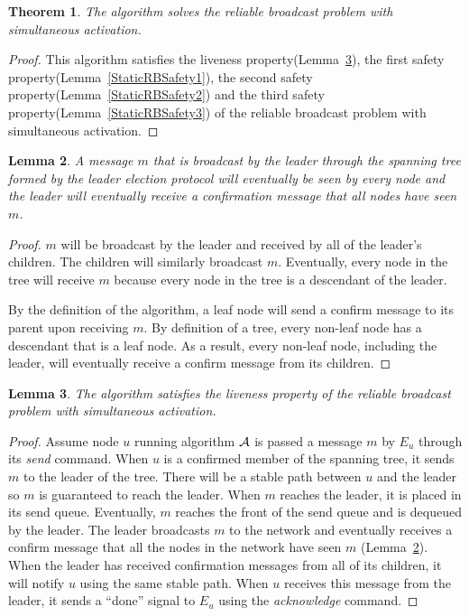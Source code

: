 \documentclass[english]{article}
\newtheorem{theorem}{Theorem}[section]
\newtheorem{lemma}[theorem]{Lemma}
\begin{document}
\begin{theorem}
\label{StaticReliableBroadcast}
The algorithm solves the reliable broadcast problem with simultaneous activation.
\end{theorem}
\begin{proof}
This algorithm satisfies the liveness property(Lemma~\ref{StaticRBLiveness}), 
the first safety property(Lemma~\ref{StaticRBSafety1}),
the second safety property(Lemma~\ref{StaticRBSafety2}) and 
the third safety property(Lemma~\ref{StaticRBSafety3}) of the reliable broadcast problem with simultaneous activation.
\end{proof}


\begin{lemma}
\label{StaticSpanningTree}
A message $m$ that is broadcast by the leader through the spanning tree formed by the leader election protocol will eventually be seen by every node and the leader will eventually receive a confirmation message that all nodes have seen $m$.
\end{lemma}
\begin{proof}

$m$ will be broadcast by the leader and received by all of the leader's children. The children will similarly broadcast $m$. Eventually, every node in the tree will receive $m$ because every node in the tree is a descendant of the leader. 

By the definition of the algorithm, a leaf node will send a confirm message to its parent upon receiving $m$. By definition of a tree, every non-leaf node has a descendant that is a leaf node. As a result, every non-leaf node, including the leader, will eventually receive a confirm message from its children.

\end{proof}


\begin{lemma}
\label{StaticRBLiveness}
The algorithm satisfies the liveness property of the reliable broadcast problem with simultaneous activation.
\end{lemma}
\begin{proof}

Assume node $u$ running algorithm $\cal A$ is passed a message $m$ by $E_u$ through its \textit{send} command. When $u$ is a confirmed member of the spanning tree, it sends $m$ to the leader of the tree. There will be a stable path between $u$ and the leader so $m$ is guaranteed to reach the leader. When $m$ reaches the leader, it is placed in its send queue. Eventually, $m$ reaches the front of the send queue and is dequeued by the leader. The leader broadcasts $m$ to the network and eventually receives a confirm message that all the nodes in the network have seen $m$ (Lemma~\ref{StaticSpanningTree}). When the leader has received confirmation messages from all of its children, it will notify $u$ using the same stable path. When $u$ receives this message from the leader, it sends  a ``done'' signal to $E_u$ using the \textit{acknowledge} command.

\end{proof}
\end{document}

